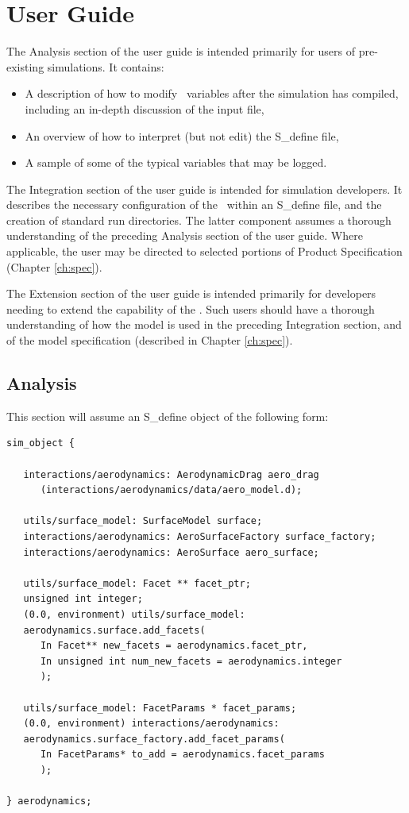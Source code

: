 

\chapter{User Guide}\label{ch:user}
The Analysis section of the user guide is intended primarily for users of pre-existing simulations.
It contains:
\begin{itemize}
\item A description of how to modify \aerodynamicsDesc\ variables after the simulation
has compiled, including an in-depth discussion of the input file,
\item An overview of how to interpret (but not edit) the S\_define file,
\item A sample of some of the typical variables that may be logged.
\end{itemize}

The Integration section of the user guide is intended for simulation developers.
It describes the necessary configuration of the \aerodynamicsDesc\ within an
S\_define file, and the creation of standard run directories.  The latter
component assumes a thorough understanding of the preceding Analysis section of the user guide.
Where applicable, the user may be directed to selected portions of Product Specification (Chapter \ref{ch:spec}).

The Extension section of the user guide is intended primarily for developers
needing to extend the capability of the \aerodynamicsDesc.  Such users should have a
thorough understanding of how the model is used in the preceding
Integration section, and of the model
specification (described in Chapter \ref{ch:spec}).

\section{Analysis}

This section will assume an S\_define object of the following form:

\begin{verbatim}
sim_object {

   interactions/aerodynamics: AerodynamicDrag aero_drag
      (interactions/aerodynamics/data/aero_model.d);

   utils/surface_model: SurfaceModel surface;
   interactions/aerodynamics: AeroSurfaceFactory surface_factory;
   interactions/aerodynamics: AeroSurface aero_surface;

   utils/surface_model: Facet ** facet_ptr;
   unsigned int integer;
   (0.0, environment) utils/surface_model:
   aerodynamics.surface.add_facets(
      In Facet** new_facets = aerodynamics.facet_ptr,
      In unsigned int num_new_facets = aerodynamics.integer
      );

   utils/surface_model: FacetParams * facet_params;
   (0.0, environment) interactions/aerodynamics:
   aerodynamics.surface_factory.add_facet_params(
      In FacetParams* to_add = aerodynamics.facet_params
      );

} aerodynamics;
\end{verbatim}

